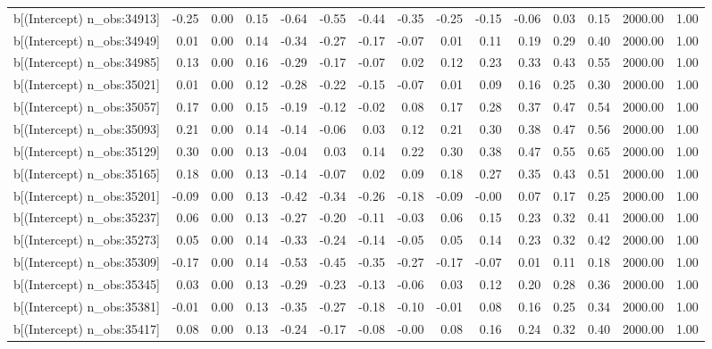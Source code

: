 \begin{table}[ht]
\begin{tabular}{rrrrrrrrrrrrrrr}
  b[(Intercept) n\_obs:34913] & -0.25 & 0.00 & 0.15 & -0.64 & -0.55 & -0.44 & -0.35 & -0.25 & -0.15 & -0.06 & 0.03 & 0.15 & 2000.00 & 1.00 \\ 
  b[(Intercept) n\_obs:34949] & 0.01 & 0.00 & 0.14 & -0.34 & -0.27 & -0.17 & -0.07 & 0.01 & 0.11 & 0.19 & 0.29 & 0.40 & 2000.00 & 1.00 \\ 
  b[(Intercept) n\_obs:34985] & 0.13 & 0.00 & 0.16 & -0.29 & -0.17 & -0.07 & 0.02 & 0.12 & 0.23 & 0.33 & 0.43 & 0.55 & 2000.00 & 1.00 \\ 
  b[(Intercept) n\_obs:35021] & 0.01 & 0.00 & 0.12 & -0.28 & -0.22 & -0.15 & -0.07 & 0.01 & 0.09 & 0.16 & 0.25 & 0.30 & 2000.00 & 1.00 \\ 
  b[(Intercept) n\_obs:35057] & 0.17 & 0.00 & 0.15 & -0.19 & -0.12 & -0.02 & 0.08 & 0.17 & 0.28 & 0.37 & 0.47 & 0.54 & 2000.00 & 1.00 \\ 
  b[(Intercept) n\_obs:35093] & 0.21 & 0.00 & 0.14 & -0.14 & -0.06 & 0.03 & 0.12 & 0.21 & 0.30 & 0.38 & 0.47 & 0.56 & 2000.00 & 1.00 \\ 
  b[(Intercept) n\_obs:35129] & 0.30 & 0.00 & 0.13 & -0.04 & 0.03 & 0.14 & 0.22 & 0.30 & 0.38 & 0.47 & 0.55 & 0.65 & 2000.00 & 1.00 \\ 
  b[(Intercept) n\_obs:35165] & 0.18 & 0.00 & 0.13 & -0.14 & -0.07 & 0.02 & 0.09 & 0.18 & 0.27 & 0.35 & 0.43 & 0.51 & 2000.00 & 1.00 \\ 
  b[(Intercept) n\_obs:35201] & -0.09 & 0.00 & 0.13 & -0.42 & -0.34 & -0.26 & -0.18 & -0.09 & -0.00 & 0.07 & 0.17 & 0.25 & 2000.00 & 1.00 \\ 
  b[(Intercept) n\_obs:35237] & 0.06 & 0.00 & 0.13 & -0.27 & -0.20 & -0.11 & -0.03 & 0.06 & 0.15 & 0.23 & 0.32 & 0.41 & 2000.00 & 1.00 \\ 
  b[(Intercept) n\_obs:35273] & 0.05 & 0.00 & 0.14 & -0.33 & -0.24 & -0.14 & -0.05 & 0.05 & 0.14 & 0.23 & 0.32 & 0.42 & 2000.00 & 1.00 \\ 
  b[(Intercept) n\_obs:35309] & -0.17 & 0.00 & 0.14 & -0.53 & -0.45 & -0.35 & -0.27 & -0.17 & -0.07 & 0.01 & 0.11 & 0.18 & 2000.00 & 1.00 \\ 
  b[(Intercept) n\_obs:35345] & 0.03 & 0.00 & 0.13 & -0.29 & -0.23 & -0.13 & -0.06 & 0.03 & 0.12 & 0.20 & 0.28 & 0.36 & 2000.00 & 1.00 \\ 
  b[(Intercept) n\_obs:35381] & -0.01 & 0.00 & 0.13 & -0.35 & -0.27 & -0.18 & -0.10 & -0.01 & 0.08 & 0.16 & 0.25 & 0.34 & 2000.00 & 1.00 \\ 
  b[(Intercept) n\_obs:35417] & 0.08 & 0.00 & 0.13 & -0.24 & -0.17 & -0.08 & -0.00 & 0.08 & 0.16 & 0.24 & 0.32 & 0.40 & 2000.00 & 1.00 \\ 

\end{tabular}
\end{table}
